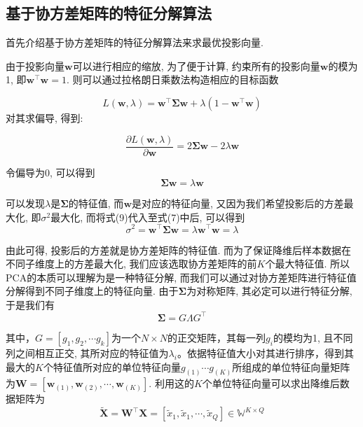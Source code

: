 \documentclass[lang=cn,10pt]{gorgeousnbook}
\numberwithin{equation}{section}%
\numberwithin{figure}{section}%
\begin{document}
\subsection{基于协方差矩阵的特征分解算法}

首先介绍基于协方差矩阵的特征分解算法来求最优投影向量.

由于投影向量$\mathbf{w}$可以进行相应的缩放, 为了便于计算, 约束所有的投影向量$\mathbf{w}$的模为1, 即$\mathbf{w}^{\top}\mathbf{w}=1$. 则可以通过拉格朗日乘数法构造相应的目标函数

\begin{equation}
L\left( \mathbf{w,}\lambda \right) =\mathbf{w}^{\top}\mathbf{\Sigma w}+\lambda \left( 1-\mathbf{w}^{\top}\mathbf{w} \right) 
\end{equation}
对其求偏导, 得到:

\begin{equation}
\frac{\partial L\left( \mathbf{w,}\lambda \right)}{\partial \mathbf{w}}=2\mathbf{\Sigma w}-2\lambda \mathbf{w}
\end{equation}

令偏导为0, 可以得到
\begin{equation}
\mathbf{\Sigma w}=\lambda \mathbf{w}
\end{equation}

可以发现$\lambda$是$\mathbf{\Sigma}$的特征值, 而$\mathbf{w}$是对应的特征向量, 又因为我们希望投影后的方差最大化, 即$\sigma ^2$最大化, 而将式(9)代入至式(7)中后, 可以得到
\begin{equation}
\sigma ^2=\mathbf{w}^{\top}\mathbf{\Sigma w}=\lambda \mathbf{w}^{\top}\mathbf{w}=\lambda 
\end{equation}

由此可得, 投影后的方差就是协方差矩阵的特征值. 而为了保证降维后样本数据在不同子维度上的方差最大化, 我们应该选取协方差矩阵的前$K$个最大特征值. 所以PCA的本质可以理解为是一种特征分解, 而我们可以通过对协方差矩阵进行特征值分解得到不同子维度上的特征向量. 由于$\mathbf{\Sigma}$为对称矩阵, 其必定可以进行特征分解, 于是我们有
\begin{equation}
\mathbf{\Sigma} = G\varLambda G^{\top}
\end{equation}

其中，$G=\left[ g_1,g_2,\cdots g_k \right]$为一个$N\times N$的正交矩阵，其每一列$g_i$的模均为1, 且不同列之间相互正交, 其所对应的特征值为$\lambda_i$。依据特征值大小对其进行排序，得到其最大的$K$个特征值所对应的单位特征向量$g_{\left( 1 \right)} \cdots g_{\left( K \right)}$所组成的单位特征向量矩阵为$\mathbf{W}=\left[ \mathbf{w}_{\left( 1 \right)},\mathbf{w}_{\left( 2 \right)},\cdots ,\mathbf{w}_{\left( K \right)} \right] $. 利用这的$K$个单位特征向量可以求出降维后数据矩阵为
\begin{equation}
\mathbf{\tilde{X}}=\mathbf{W}^{\top}\mathbf{X}=\left[ \tilde{x}_1,\tilde{x}_1,\cdots ,\tilde{x}_Q \right] \in \mathbb{W}^{K\times Q}
\end{equation}
\end{document}
